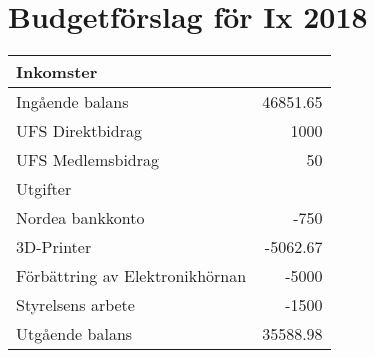 \documentclass[a4paper,11pt,oneside]{article}
\begin{document}
\section*{Budgetförslag för Ix 2018}

\begin{tabular}{lr}
  \toprule
  Inkomster & \\
  \midrule
  Ingående balans & 46851.65 \\
  UFS Direktbidrag & 1000 \\
  UFS Medlemsbidrag & 50 \\
  \midrule
  Utgifter & \\
  \midrule
  Nordea bankkonto & -750 \\
  3D-Printer & -5062.67 \\
  Förbättring av Elektronikhörnan & -5000 \\
  Styrelsens arbete & -1500 \\
  \midrule
  Utgående balans & 35588.98 \\
  \bottomrule
\end{tabular}
\end{document}
